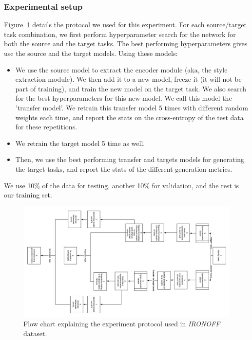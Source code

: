     \subsubsection{Experimental setup}
      \par Figure~\ref{fig:ironoff_protocol} details the protocol we used for this experiment. For each source/target task combination, we first perform hyperparameter search for the network for both the source and the target tasks. The best performing hyperparameters gives use the source and the target models. Using these models:
      \begin{itemize}
        \item We use the source model to extract the encoder module (aka, the style extraction module). We then add it to a new model, freeze it (it will not be part of training), and train the new model on the target task. We also search for the best hyperparameters for this new model. We call this model the 'transfer model'. We retrain this transfer model 5 times with different random weights each time, and report the stats on the cross-entropy of the test data for these repetitions.
        \item We retrain the target model 5 time as well.
        \item Then, we use the best performing transfer and targets models for generating the target tasks, and report the stats of the different generation metrics.
      \end{itemize}
      \par We use 10\% of the data for testing, another 10\% for validation, and the rest is our training set.

    \begin{figure}
      \includegraphics[scale=0.3]{images/sota/ironoff_results/IRONOFF_transfer_learning_flow.png}
      \caption[\textit{IRONOFF} experimental protocol]{Flow chart explaining the experiment protocol used in \textit{IRONOFF} dataset.}
      \label{fig:ironoff_protocol}
    \end{figure}

